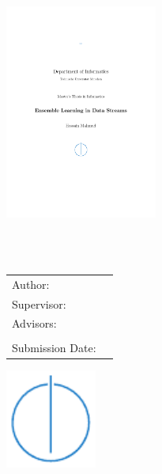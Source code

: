 \begin{titlepage}
    \centering
    
    \vspace*{10mm}
    \includegraphics[width=50mm]{logo/tum}
    
    \vspace{10mm}
    {\Huge \textsc{\faculty{}}}\\
    
    \vspace{5mm}
    {\huge \scshape{\university{}}}\\
    
    \vspace{23mm}
    {\Large \doctype{}}
    
    \vspace{22mm}
    {\huge\bfseries \thesisTitleDE{}}
    
    \vspace{10mm}
    {\huge\bfseries \thesisTitle{}}
    
    
    \vspace{14mm}
    {\Large
    \begin{tabular}{l l}
    Author:		& \thesisAuthor{} \\
    Supervisor:	& \supervisor{} \\
    Advisors: 	& \advisorFirst{} \\
                & \advisorSecond{} \\
    Submission Date: & \submissionDate{} \\
    \end{tabular}
    }
    
    \vspace{13mm}
    \includegraphics[width=30mm]{logo/faculty}
\end{titlepage}
